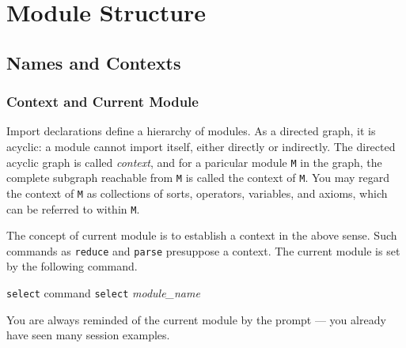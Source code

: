 \documentclass[a4paper]{memoir}
\begin{document}
\chapter{Module Structure}\label{sec:p2-module-hierarchies}

\section{Names and Contexts}

\subsection{Context and Current Module}\label{sec:p2-current-module}

Import declarations define a hierarchy of modules. As a directed graph,
it is acyclic: a module cannot import itself, either directly or
indirectly. The directed acyclic graph is called
{\em context},
and for a paricular module \verb|M| in the
graph, the complete subgraph reachable from \verb|M| is called
the context of \verb|M|. You may regard the context of \verb|M| as
collections of sorts, operators, variables, and axioms, which can
be referred to within \verb|M|.

The concept of current module is to establish
a context in the above sense. Such commands as \verb|reduce| and
\verb|parse| presuppose a context. The current module is set by the
following command.

\begin{bsyntax} \texttt{select} command  \Hline
\texttt{select} \textit{module\_name}
\end{bsyntax}

You are always reminded of
the current module by the prompt --- you already have seen many
session examples.
\end{document}

